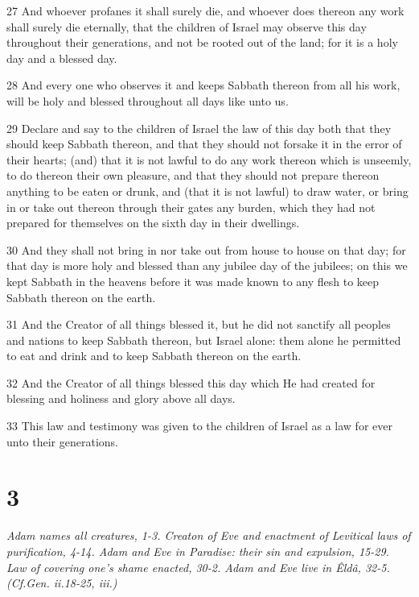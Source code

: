 \par 27 And whoever profanes it shall surely die, and whoever does thereon any work shall surely die eternally, that the children of Israel may observe this day throughout their generations, and not be rooted out of the land; for it is a holy day and a blessed day.
\par 28 And every one who observes it and keeps Sabbath thereon from all his work, will be holy and blessed throughout all days like unto us.
\par 29 Declare and say to the children of Israel the law of this day both that they should keep Sabbath thereon, and that they should not forsake it in the error of their hearts; (and) that it is not lawful to do any work thereon which is unseemly, to do thereon their own pleasure, and that they should not prepare thereon anything to be eaten or drunk, and (that it is not lawful) to draw water, or bring in or take out thereon through their gates any burden, which they had not prepared for themselves on the sixth day in their dwellings.
\par 30 And they shall not bring in nor take out from house to house on that day; for that day is more holy and blessed than any jubilee day of the jubilees; on this we kept Sabbath in the heavens before it was made known to any flesh to keep Sabbath thereon on the earth.
\par 31 And the Creator of all things blessed it, but he did not sanctify all peoples and nations to keep Sabbath thereon, but Israel alone: them alone he permitted to eat and drink and to keep Sabbath thereon on the earth.
\par 32 And the Creator of all things blessed this day which He had created for blessing and holiness and glory above all days.
\par 33 This law and testimony was given to the children of Israel as a law for ever unto their generations.

\chapter{3}

\par \textit{Adam names all creatures, 1-3. Creaton of Eve and enactment of Levitical laws of purification, 4-14. Adam and Eve in Paradise: their sin and expulsion, 15-29. Law of covering one's shame enacted, 30-2. Adam and Eve live in Êldâ, 32-5. (Cf.Gen. ii.18-25, iii.)}

